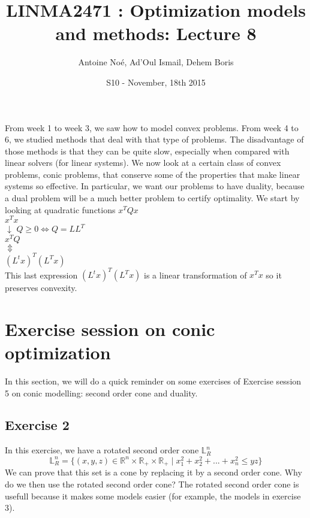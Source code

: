 \documentclass[11pt,a4paper]{article}
\title{LINMA2471 : Optimization models and methods: Lecture 8}
\author{Antoine Noé, Ad'Oul Ismail, Dehem Boris}
\date{S10 - November, 18th 2015}
\begin{document}
\maketitle

From week 1 to week 3, we saw how to model convex problems. From week 4 to 6, we studied methods that deal with that type of problems. The disadvantage of those methods is that they can be quite slow, especially when compared with linear solvers (for linear systems). We now look at a certain class of convex problems, conic problems, that conserve some of the properties that make linear systems so effective. In particular, we want our problems to have duality, because a dual problem will be a much better problem to certify optimality. We start by looking at quadratic functions $x^TQx$ \\

\noindent $x^Tx$\\
$\downarrow$ \qquad $Q \geq 0 \Longleftrightarrow Q=LL^T$ \\
$x^TQ$ \\
$\Updownarrow$ \\
$(L^tx)^T(L^Tx)$\\

This last expression $(L^tx)^T(L^Tx)$ is a linear transformation of $x^Tx$ so it preserves convexity.\\

\section{Exercise session on conic optimization}
In this section, we will do a quick reminder on some exercises of Exercise session 5 on conic modelling: second order cone and duality. 

\subsection*{Exercise 2}
In this exercise, we have a rotated second order cone $\mathbb{L}^n_R $
$$\mathbb{L}^n_R=\{(x,y,z)\in \mathbb{R}^n\times \mathbb{R}_+ \times \mathbb{R}_+ \mid x_1^2+x_2^2+...+x_n^2 \leq yz \}$$ 
We can prove that this set is a cone by replacing it by a second order cone. Why do we then use the rotated second order cone? The rotated second order cone is usefull because it makes some models easier (for example, the models in exercise 3). 
\end{document}
